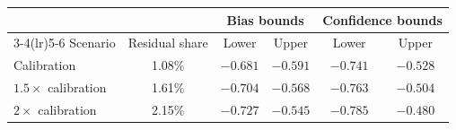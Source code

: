 \begin{tabular}{lccccc}
\toprule
 & & \multicolumn{2}{c}{Bias bounds} & \multicolumn{2}{c}{Confidence bounds}\\
\cmidrule(lr){3-4}\cmidrule(lr){5-6}
Scenario & Residual share & Lower & Upper & Lower & Upper\\
\midrule
Calibration & 1.08\% & $-0.681$ & $-0.591$ & $-0.741$ & $-0.528$\\
$1.5\times$ calibration & 1.61\% & $-0.704$ & $-0.568$ & $-0.763$ & $-0.504$\\
$2\times$ calibration & 2.15\% & $-0.727$ & $-0.545$ & $-0.785$ & $-0.480$\\
\bottomrule
\end{tabular}
